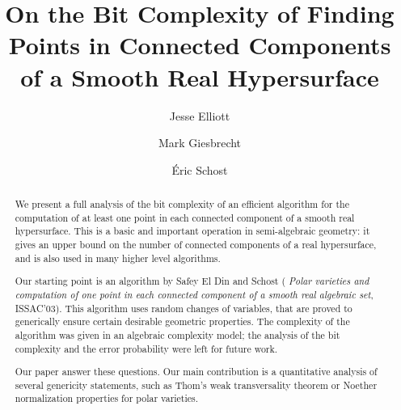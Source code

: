 \documentclass[sigconf]{acmart}
\begin{document}
\title{On the Bit Complexity of Finding Points in Connected Components of a Smooth Real Hypersurface}

\author{Jesse Elliott}

\author{Mark Giesbrecht}

\author{\'Eric Schost}
\renewcommand{\shortauthors}{Elliott, Giesbrecht, and Schost.}

\begin{abstract}
  We present a full analysis of the bit complexity of an efficient
  algorithm for the computation of at least one point in each
  connected component of a smooth real hypersurface. This is a basic
  and important operation in semi-algebraic geometry: it gives an
  upper bound on the number of connected components of a real
  hypersurface, and is also used in many higher level algorithms.
  
  Our starting point is an algorithm by Safey El Din and Schost ({\em
    Polar varieties and computation of one point in each connected
    component of a smooth real algebraic set}, ISSAC'03). This
  algorithm uses random changes of variables, that are proved to
  generically ensure certain desirable geometric properties. The
  complexity of the algorithm was given in an algebraic complexity
  model; the analysis of the bit complexity and the error probability
  were left for future work.

  Our paper answer these questions. Our main contribution is a
  quantitative analysis of several genericity statements, such as
  Thom's weak transversality theorem or Noether normalization
  properties for polar varieties.
\end{abstract}
\end{document}
